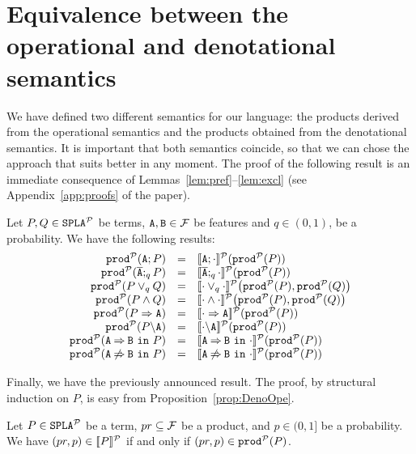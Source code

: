\section{Equivalence between the operational and denotational semantics}\label{sec:equivalenceMain}
We have defined two different semantics for our language:
the products derived from the operational semantics and the products
obtained from the denotational semantics. It is important that
both semantics coincide, so that we can chose the approach that suits
better in any moment. The proof of the following result is an immediate consequence of Lemmas~\ref{lem:pref}--\ref{lem:excl} (see Appendix~\ref{app:proofs} of the paper).

\bprop\label{prop:DenoOpe}
  Let $P,Q\in\mathtt{SPLA{^{\cal P}}}$ be terms, $\mathtt{A},\mathtt{B}\in{\cal F}$ be features and $q\in (0,1)$, be a probability. We have the following results:
  $$\begin{array}{rll}
  \prodp(\feature{A};P)&=&\semdenp{\feature{A};\cdot}(\prodp(P))\\
  \prodp(\ofeature{A};_qP)&=&\semdenp{\ofeature{A};_q\cdot}(\prodp(P))\\
  \prodp(P\choice_q Q)&=&\semdenp{\cdot\choice_q\cdot}\bigl(\prodp(P),\prodp(Q)\bigr)\\
  \prodp(P\paral Q)&=&\semdenp{\cdot\paral\cdot}\bigl(\prodp(P),\prodp(Q)\bigr)\\
  \prodp(\mandatory{A}{P})&=&\semdenp{\mandatory{A}{\cdot}}(\prodp(P))\\
  \prodp(\forbid{A}{P})&=&\semdenp{\forbid{A}{\cdot}}(\prodp(P))\\
  \prodp(\require{A}{B}{P})&=&\semdenp{\require{A}{B}{\cdot}}(\prodp(P))\\
  \prodp(\exclude{A}{B}{P})&=&\semdenp{\exclude{A}{B}{\cdot}}(\prodp(P))
\end{array}$$
\eprop

Finally, we have the previously announced result. The proof, by structural induction on $P$, is easy from
Proposition~\ref{prop:DenoOpe}.


\bthm\label{prop:equivprob}
  Let $P\in\mathtt{SPLA{^{\cal P}}}$ be a term, $pr\subseteq{\cal F}$ be a product, and
  $p\in(0,1]$ be a probability. We have $ (pr,p)\in[\![P]\!]^{\cal P}$ if and only if
  $(pr,p)\in\mathtt{prod}^{\cal P}(P)$.
\ethm



